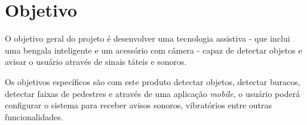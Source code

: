 \section{Objetivo}

O objetivo geral do projeto é desenvolver uma tecnologia assistiva - que inclui uma bengala inteligente e um acessório com câmera - capaz de detectar objetos e avisar o usuário através de sinais táteis e sonoros.

Os objetivos específicos são com este produto detectar objetos, detectar buracos, detectar faixas de pedestres e através de uma aplicação \textit{mobile}, o usuário poderá configurar o sistema para receber avisos sonoros, vibratórios entre outras funcionalidades.
